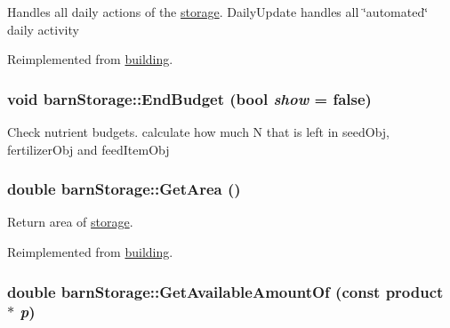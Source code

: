 Handles all daily actions of the \hyperlink{classstorage}{storage}. DailyUpdate handles all \char`\"{}automated\char`\"{} daily activity 

Reimplemented from \hyperlink{classbuilding_a584ba300427d2a648f478b68065b7a18}{building}.\hypertarget{classbarn_storage_a0b4aeb51dd52aff5b8f543528f6bd45c}{
\subsubsection[{EndBudget}]{\setlength{\rightskip}{0pt plus 5cm}void barnStorage::EndBudget (bool {\em show} = {\ttfamily false})}}
\label{classbarn_storage_a0b4aeb51dd52aff5b8f543528f6bd45c}


Check nutrient budgets. calculate how much N that is left in seedObj, fertilizerObj and feedItemObj \hypertarget{classbarn_storage_a727f13788856da203570834247a7b475}{
\subsubsection[{GetArea}]{\setlength{\rightskip}{0pt plus 5cm}double barnStorage::GetArea ()}}
\label{classbarn_storage_a727f13788856da203570834247a7b475}


Return area of \hyperlink{classstorage}{storage}. 

Reimplemented from \hyperlink{classbuilding_a930bf40915b04b091ce5fa00cf15c58e}{building}.\hypertarget{classbarn_storage_a37fc55dbb7648f0890efdc342a4d29e6}{
\subsubsection[{GetAvailableAmountOf}]{\setlength{\rightskip}{0pt plus 5cm}double barnStorage::GetAvailableAmountOf (const {\bf product} $\ast$ {\em p})}}
\label{classbarn_storage_a37fc55dbb7648f0890efdc342a4d29e6}


